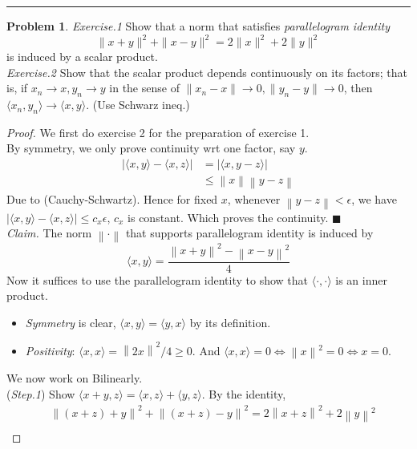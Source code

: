 \documentclass[a4paper, 10pt]{article}
\theoremstyle{definition}
\newtheorem{problem}{Problem}
\theoremstyle{hSol}
\begin{document}
\noindent\rule{16cm}{0.4pt}
\begin{problem} \textit{Exercise.1} Show that a norm that satisfies \textit{parallelogram identity}
$$\|x+y\|^2 + \|x-y\|^2 = 2 \|x\|^2 + 2 \|y\|^2$$
is induced by a scalar product. \\
\textit{Exercise.2} Show that the scalar product depends continuously on its factors; that is, if $x_n \to x, y_n \to y$ in the sense of $\|x_n - x\|\to 0, \|y_n - y\|\to 0$, then $\langle x_n, y_n \rangle \to \langle x, y \rangle$. (Use Schwarz ineq.)
\end{problem}
\begin{proof} We first do exercise 2 for the preparation of exercise 1. \\
By symmetry, we only prove continuity wrt one factor, say $y$.
\begin{equation}
	\begin{split}
		|\langle x,y \rangle - \langle x,z \rangle| &= |\langle x, y-z \rangle| \\
		&\leq \left\|x\right\| \left\|y-z\right\|
	\end{split}
\end{equation}
Due to (Cauchy-Schwartz). Hence for fixed $x$, whenever $\left\|y-z\right\|<\epsilon$, we have $|\langle x,y \rangle- \langle x,z \rangle|\leq c_x \epsilon$, $c_x$ is constant. Which proves the continuity. $\blacksquare$ \\
\textit{Claim.} The norm $\left\|\cdot\right\|$ that supports parallelogram identity is induced by
$$\langle x,y \rangle=\frac{\left\|x+y\right\|^2-\left\|x-y\right\|^2}{4}$$
Now it suffices to use the parallelogram identity to show that $\langle \cdot, \cdot \rangle$ is an inner product.
\begin{itemize}
	\item[] \textit{Symmetry} is clear, $\langle x,y \rangle=\langle y,x \rangle$ by its definition.
	\item[] \textit{Positivity}: $\langle x,x \rangle=\left\|2x\right\|^2/4 \geq 0$. And $\langle x,x \rangle=0 \iff \left\|x\right\|^2=0 \iff x=0$.
\end{itemize}
We now work on Bilinearly.\\
(\textit{Step.1}) Show $\langle x+y,z \rangle=\langle x,z \rangle+\langle y,z \rangle$.
By the identity,
\begin{equation}
	\begin{split}
		& \left\|(x+z)+y\right\|^2 + \left\|(x+z)-y\right\|^2 = 2 \left\|x+z\right\|^2 + 2\left\|y\right\|^2\\

\end{split}
\end{equation}
\end{proof}
\end{document}

